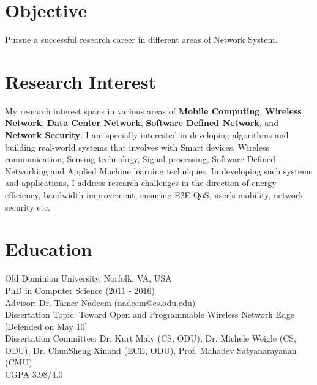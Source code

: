 \documentclass[margin]{res}
\begin{document}
 
 \vspace*{-0.3in}
 
\address{{\bf Present Address} \\109 Northampton Dr. \\
Holmdel, NJ 07733}
\address{{\bf Contact} \\ mostafa.uddin@nokia.com \\ (414)379-5199 \\
       \url{http://www.cs.odu.edu/~muddin}}

 
\begin{resume} 
 

\section{Objective} Pursue a successful research career in different areas of Network System.




\section{Research Interest} 
My research interest spans in various areas of  \textbf{Mobile Computing}, \textbf{Wireless Network}, \textbf{Data Center Network}, \textbf{Software Defined Network}, and \textbf{Network Security}. I am specially interested in developing algorithms and building real-world systems that involves with Smart devices, Wireless communication, Sensing technology, Signal processing, Software Defined Networking and Applied Machine learning techniques. In developing such systems and applications, I address research challenges in the direction of energy efficiency, bandwidth improvement, ensuring E2E QoS, user's mobility, network security etc. 
  

\section{Education} 

Old Dominion University, Norfolk, VA, USA\\
PhD in Computer Science (2011 - 2016)\\
Advisor: Dr. Tamer Nadeem (nadeem@cs.odu.edu)\\
Dissertation Topic: {Toward Open and Programmable Wireless Network Edge } [Defended on May 10]\\ 
Dissertation Committee: Dr. Kurt Maly (CS, ODU), Dr. Michele Weigle (CS, ODU), Dr. ChunSheng Xinand (ECE, ODU), Prof. Mahadev Satyanarayanan (CMU)\\  
CGPA 3.98/4.0


\end{resume}
\end{document}
